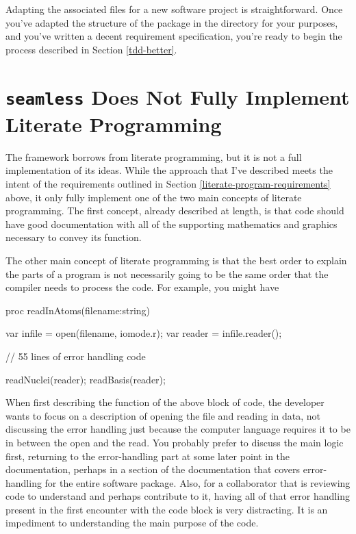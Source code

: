 Adapting the associated \latex files for a new software project is straightforward. 
Once you've adapted the structure of the \latex package in the  directory for your
purposes, and you've written a decent requirement specification, you're ready to begin the process described in
Section \ref{tdd-better}. 

\section{\texttt{seamless} Does Not Fully Implement Literate Programming}

The \seamless framework borrows from literate programming, but it is not a full implementation of its
ideas.  While the approach that I've described meets the intent of the requirements outlined in Section 
\ref{literate-program-requirements} above, it only fully implement one of the two main concepts of
literate programming.\cite{knuth}
The first concept, already described at length, is that code should have good documentation with all of the
supporting mathematics and graphics necessary to convey its function.

The other main concept of literate programming is that the best order to explain the parts of a program 
is not necessarily going to be the same order that the compiler needs to process the code. 
For example, you might have

\begin{chapel}
proc readInAtoms(filename:string) {
  var infile = open(filename, iomode.r);
  var reader = infile.reader();

  // 55 lines of error handling code

  readNuclei(reader);
  readBasis(reader);

}
\end{chapel}

When first describing the function of the above block of code, the developer wants to focus on a description of 
opening the file 
and reading in data, not discussing the error handling just because the computer language requires it to be in 
between the open and the read. You probably prefer to discuss the main logic first, returning to the error-handling 
part at some later point in the documentation, perhaps in a section of the documentation that covers error-handling
for the entire software package.
Also, for a collaborator that is reviewing code to understand and perhaps contribute to it, having all of that
error handling present in the first encounter with the code block is very distracting. It is an impediment to 
understanding the main purpose of the code.

